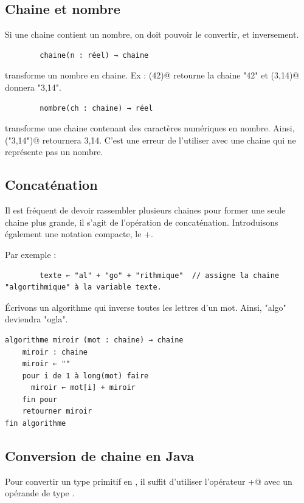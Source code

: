 \documentclass[11pt,a4paper]{article}
\begin{document}
            \par
        \subsection{Chaine et nombre}
		    Si une chaine contient un nombre, on doit pouvoir le convertir, et inversement.
		  
            \par
        \begin{verbatim}
        chaine(n : réel) → chaine
      \end{verbatim}
        transforme un nombre en chaine.
        Ex : \verb@chaine(42)@ retourne la chaine "42" et 
        \verb@chaine(3,14)@ donnera "3,14".
      
            \par
        \begin{verbatim}
        nombre(ch : chaine) → réel
      \end{verbatim}
        transforme une chaine contenant des caract\`eres num\'eriques en nombre. 
        Ainsi, \verb@nombre("3,14")@ retournera 3,14. 
        C'est une erreur de l'utiliser avec une chaine qui ne repr\'esente pas un nombre.
      
            \par
        \subsection{Concat\'enation}
		    Il est fr\'equent de devoir rassembler plusieurs chaines pour former une seule chaine plus
        grande, il s'agit de l'op\'eration de concat\'enation. Introduisons \'egalement une notation
        compacte, le +. 
      
            \par
        Par exemple :
            \par
        \begin{verbatim}
        texte ← "al" + "go" + "rithmique"  // assigne la chaine "algortihmique" à la variable texte.
      \end{verbatim}
        \'Ecrivons un algorithme qui inverse toutes les lettres d'un mot. 
        Ainsi, "algo" deviendra "ogla".
      
            \par
        \begin{verbatim}
algorithme miroir (mot : chaine) → chaine
    miroir : chaine
    miroir ← ""
    pour i de 1 à long(mot) faire
      miroir ← mot[i] + miroir
    fin pour
    retourner miroir
fin algorithme      
      \end{verbatim}\subsection{Conversion de chaine en Java}
		    Pour convertir un type primitif en \verb@String@, 
		    il suffit d'utiliser l'op\'erateur \verb@+@ 
		    avec un op\'erande de type \verb@String@.
      
\end{document}
